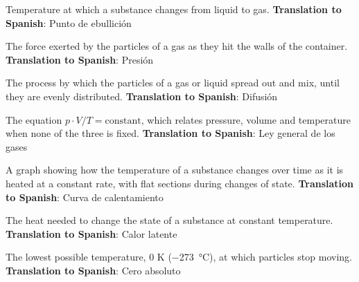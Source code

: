 \begin{vocabulary}
    Temperature at which a substance changes from liquid to gas. \newline
    \textbf{Translation to Spanish}: Punto de ebullición
\end{vocabulary}

\begin{vocabulary}[Pressure]
    The force exerted by the particles of a gas as they hit the walls of the container. \newline
    \textbf{Translation to Spanish}: Presión
\end{vocabulary}

\begin{vocabulary}[Diffusion]
    The process by which the particles of a gas or liquid spread out and mix, until they are evenly distributed. \newline
    \textbf{Translation to Spanish}: Difusión
\end{vocabulary}

\begin{vocabulary}
    The equation $p \cdot V / T = \text{constant}$, which relates pressure, volume and temperature when none of the three is fixed. \newline
    \textbf{Translation to Spanish}: Ley general de los gases
\end{vocabulary}

\begin{vocabulary}
    A graph showing how the temperature of a substance changes over time as it is heated at a constant rate, with flat sections during changes of state. \newline
    \textbf{Translation to Spanish}: Curva de calentamiento
\end{vocabulary}

\begin{vocabulary}
    The heat needed to change the state of a substance at constant temperature. \newline
    \textbf{Translation to Spanish}: Calor latente
\end{vocabulary}

\begin{vocabulary}
    The lowest possible temperature, 0 K (\qty{-273}{\celsius}), at which particles stop moving. \newline
    \textbf{Translation to Spanish}: Cero absoluto
\end{vocabulary}

